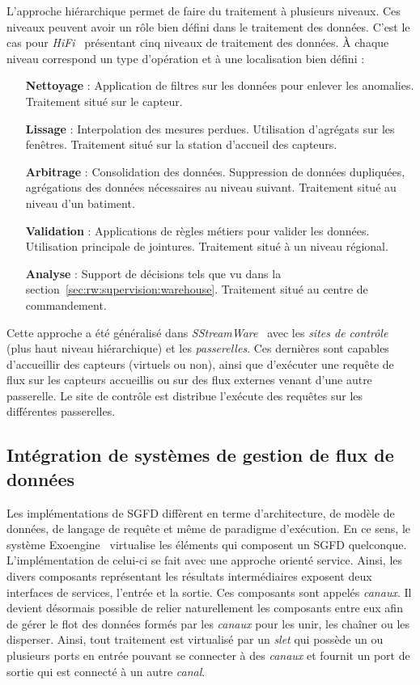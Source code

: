 L'approche hiérarchique permet de faire du traitement à plusieurs niveaux. Ces niveaux peuvent avoir un rôle bien défini dans le traitement des données. C'est le cas pour \textit{HiFi}~\cite{Franklin:hifi} présentant cinq niveaux de traitement des données. À chaque niveau correspond un type d'opération et à une localisation bien défini :
\begin{itemize}
	\item[\textbf{Nettoyage} :] Application de filtres sur les données pour enlever les anomalies. Traitement situé sur le capteur.
	\item[\textbf{Lissage} :] Interpolation des mesures perdues. Utilisation d'agrégats sur les fenêtres. Traitement situé sur la station d'accueil des capteurs.
	\item[\textbf{Arbitrage} :] Consolidation des données. Suppression de données dupliquées, agrégations des données nécessaires au niveau suivant. Traitement situé au niveau d'un batiment.
	\item[\textbf{Validation} :] Applications de règles métiers pour valider les données. Utilisation principale de jointures. Traitement situé à un niveau régional.
	\item[\textbf{Analyse} :] Support de décisions tels que vu dans la section~\ref{sec:rw:supervision:warehouse}. Traitement situé au centre de commandement.
\end{itemize}

Cette approche a été généralisé dans \textit{SStreamWare}~\cite{Gurgen:sstreamware} avec les \textit{sites de contrôle} (plus haut niveau hiérarchique) et les \textit{passerelles}. Ces dernières sont capables d'accueillir des capteurs (virtuels ou non), ainsi que d'exécuter une requête de flux sur les capteurs accueillis ou sur des flux externes venant d'une autre passerelle. Le site de contrôle est distribue l'exécute des requêtes sur les différentes passerelles.

\subsection{Intégration de systèmes de gestion de flux de données}
Les implémentations de SGFD diffèrent en terme d'architecture, de modèle de données, de langage de requête et même de paradigme d'exécution. En ce sens, le système Exoengine~\cite{Duller:virtualdsms} virtualise les éléments qui composent un SGFD quelconque. L'implémentation de celui-ci se fait avec une approche orienté service. Ainsi, les divers composants représentant les résultats intermédiaires exposent deux interfaces de services, l'entrée et la sortie. Ces composants sont appelés \textit{canaux}. Il devient désormais possible de relier naturellement les composants entre eux afin de gérer le flot des données formés par les \textit{canaux} pour les unir, les chaîner ou les disperser. Ainsi, tout traitement est virtualisé par un \textit{slet} qui possède un ou plusieurs ports en entrée pouvant se connecter à des \textit{canaux} et fournit un port de sortie qui est connecté à un autre \textit{canal}.

